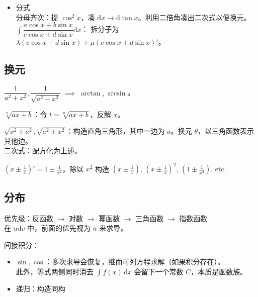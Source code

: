 \documentclass[12pt, a4paper, UTF8, openany]{ctexbook}
\newcommand{\dif}{\mathrm{d}}
\newcommand{\difx}{\,\mathrm{d}x}
\begin{document}
\begin{itemize}
            \item 分式\\
                分母齐次：提 $\cos^2 x$，凑 $\dif x \to \dif\tan x$。利用二倍角凑出二次式以便换元。\\
                $\int \dfrac{a\cos x + b\sin x}{c\cos x + d\sin x}\dif x$：
                    拆分子为 $\lambda(c\cos x + d\sin x) + \mu(c\cos x + d\sin x)'$。
        \end{itemize}

        \subsection{换元}
        $\dfrac{1}{a^2 + x^2}, \dfrac{1}{\sqrt{a^2 - x^2}} \; \implies \; \arctan, \arcsin$。

        $\sqrt[n]{ax + b}$：令 $t = \sqrt[n]{ax + b}$，反解 $x$。

        $\sqrt{x^2 \pm a^2}, \sqrt{a^2 \pm x^2}$：构造直角三角形，其中一边为 $a$。换元 $\theta$，以三角函数表示其他边。\\
        二次式：配方化为上述。

        $(x \pm \frac{1}{x})' = 1 \pm \frac{1}{x^2}$，除以 $x^2$ 构造 
        $(x \pm \frac{1}{x}),\, (x \pm \frac{1}{x})^2, \, (1 \pm \frac{1}{x^2}), \, \mathrm{etc.}$

        \subsection{分布}
        优先级：反函数 $\to$ 对数 $\to$ 幂函数 $\to$ 三角函数 $\to$ 指数函数\\
        在 $u\dif v$ 中，前面的优先视为 $u$ 来求导。

        间接积分：
        \begin{itemize}
            \item $\sin, \cos$：多次求导会恢复，继而可列方程求解（如果积分存在）。\\
                此外，等式两侧同时消去 $\int f(x)\difx$ 会留下一个常数 $C$，本质是函数族。
            \item 递归：构造同构
        \end{itemize}
\end{document}
